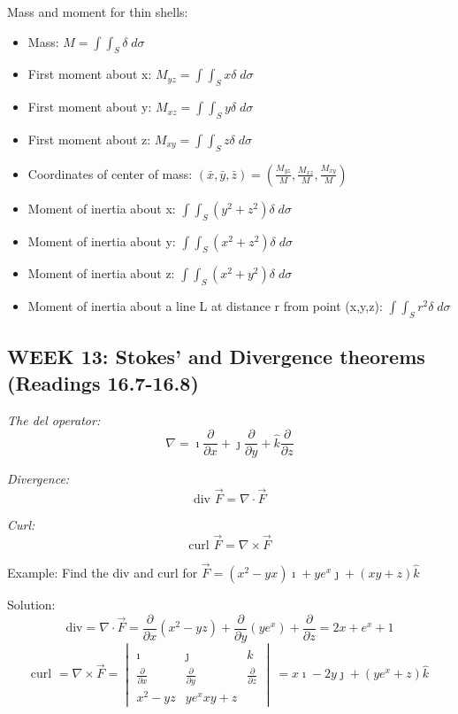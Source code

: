 \documentclass[12pt]{article}
\begin{document}
Mass and moment for thin shells:
\begin{itemize}
    \item Mass: $M = \int \int_S \delta \; d\sigma$
    \item First moment about x: $M_{yz} = \int \int_S x\delta \; d\sigma$
    \item First moment about y: $M_{xz} = \int \int_S y\delta \; d\sigma $
    \item First moment about z: $M_{xy} = \int \int_S z\delta \; d\sigma $
    \item Coordinates of center of mass: $(\bar{x}, \bar{y}, \bar{z}) = \left(\frac{M_{yz}}{M}, \frac{M_{xz}}{M}, \frac{M_{xy}}{M}\right)$
    \item Moment of inertia about x: $\int \int_S (y^2 + z^2) \delta \; d\sigma$
    \item Moment of inertia about y: $\int \int_S (x^2 + z^2) \delta \; d\sigma$
    \item Moment of inertia about z: $\int \int_S (x^2 + y^2) \delta \; d\sigma$
    \item Moment of inertia about a line L at distance r from point (x,y,z): $\int \int_S r^2 \delta \; d\sigma$
\end{itemize}
\subsection{WEEK 13: Stokes' and Divergence theorems (Readings 16.7-16.8)}
\emph{The del operator:}
\[\nabla = \imath \frac{\partial}{\partial x} + \jmath \frac{\partial}{\partial y} + \hat{k} \frac{\partial}{\partial z}\]

\emph{Divergence:}
\[\text{div }\vec{F} = \nabla \cdot \vec{F}\]

\emph{Curl:}
\[\text{curl }\vec{F} = \nabla \times \vec{F}\]

Example: Find the div and curl for $\vec{F} = (x^2 - yx) \imath + ye^x \jmath + (xy+z) \hat{k}$

Solution:
\[\text{div} = \nabla \cdot \vec{F} = \frac{\partial}{\partial x}(x^2 - yz) + \frac{\partial}{\partial y} (ye^x) + \frac{\partial}{\partial z} = 2x + e^x +1\]
\[\text{curl } = \nabla \times \vec{F} = \begin{vmatrix}
    \imath & \jmath & \hat{k}\\
    \frac{\partial}{\partial x} & \frac{\partial}{\partial y} & \frac{\partial}{\partial z}\\
    x^2 - yz & ye^x  xy + z
\end{vmatrix}\ = x\imath - 2y\jmath + (ye^x + z)\hat{k}\]
\end{document}
